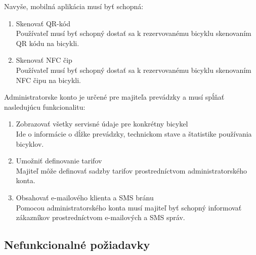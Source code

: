 \documentclass[12pt]{report}
\begin{document}
Navyše, mobilná aplikácia musí byť schopná:

\begin{enumerate}
    \item Skenovať QR-kód \\
        Používateľ musí byť schopný dostať sa k rezervovanému bicyklu skenovaním QR kódu na bicykli.
        
    \item Skenovať NFC čip \\
        Používateľ musí byť schopný dostať sa k rezervovanému bicyklu skenovaním NFC čipu na bicykli.
\end{enumerate}

Administratorske konto je určené pre majiteľa prevádzky a musí spĺňať nasledujúcu funkcionalitu:

\begin{enumerate}
    \item Zobrazovať všetky servisné údaje pre konkrétny bicykel \\
        Ide o informácie o dĺžke prevádzky, technickom stave a štatistike používania bicyklov.
        
    \item Umožniť definovanie tarifov \\
        Majiteľ môže definovať sadzby tarifov prostredníctvom administratorského konta.
        
    \item Obsahovať e-mailového klienta a SMS bránu \\
        Pomocou administratorského konta musí majiteľ byť schopný informovať zákazníkov prostredníctvom 
        e-mailových a SMS správ.

\end{enumerate}

\subsection{Nefunkcionalné požiadavky}
\end{document}
